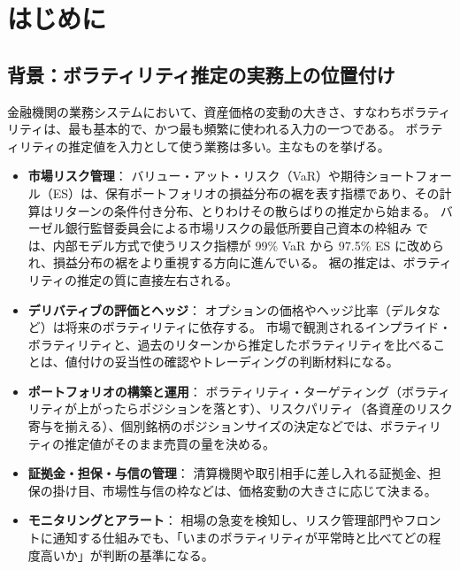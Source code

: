 \section{はじめに}\label{sec:intro}

\subsection{背景：ボラティリティ推定の実務上の位置付け}\label{sec:intro-background}

金融機関の業務システムにおいて、資産価格の変動の大きさ、すなわちボラティリティは、最も基本的で、かつ最も頻繁に使われる入力の一つである。
ボラティリティの推定値を入力として使う業務は多い。主なものを挙げる。

\begin{itemize}
  \item \textbf{市場リスク管理}：
    バリュー・アット・リスク（VaR）や期待ショートフォール（ES）は、保有ポートフォリオの損益分布の裾を表す指標であり、その計算はリターンの条件付き分布、とりわけその散らばりの推定から始まる。
    バーゼル銀行監督委員会による市場リスクの最低所要自己資本の枠組み \parencite{bcbs2019} では、内部モデル方式で使うリスク指標が 99\% VaR から 97.5\% ES に改められ、損益分布の裾をより重視する方向に進んでいる。
    裾の推定は、ボラティリティの推定の質に直接左右される。
  \item \textbf{デリバティブの評価とヘッジ}：
    オプションの価格やヘッジ比率（デルタなど）は将来のボラティリティに依存する。
    市場で観測されるインプライド・ボラティリティと、過去のリターンから推定したボラティリティを比べることは、値付けの妥当性の確認やトレーディングの判断材料になる。
  \item \textbf{ポートフォリオの構築と運用}：
    ボラティリティ・ターゲティング（ボラティリティが上がったらポジションを落とす）、リスクパリティ（各資産のリスク寄与を揃える）、個別銘柄のポジションサイズの決定などでは、ボラティリティの推定値がそのまま売買の量を決める。
  \item \textbf{証拠金・担保・与信の管理}：
    清算機関や取引相手に差し入れる証拠金、担保の掛け目、市場性与信の枠などは、価格変動の大きさに応じて決まる。
  \item \textbf{モニタリングとアラート}：
    相場の急変を検知し、リスク管理部門やフロントに通知する仕組みでも、「いまのボラティリティが平常時と比べてどの程度高いか」が判断の基準になる。
\end{itemize}

